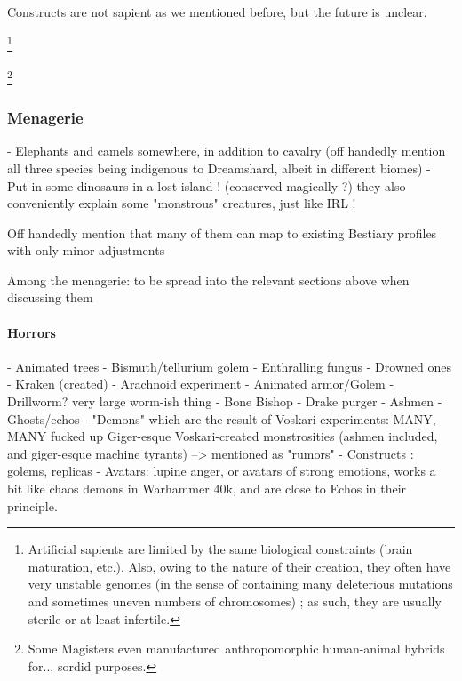 Constructs are not sapient as we mentioned before, but the future is unclear.


\footnote{Artificial sapients are limited by the same biological constraints (brain maturation, etc.). Also, owing to the nature of their creation, they often have very unstable genomes (in the sense of containing many deleterious mutations and sometimes uneven numbers of chromosomes) ; as such, they are usually sterile or at least infertile.}



\footnote{Some Magisters even manufactured anthropomorphic human-animal hybrids for... sordid purposes.}


















\subsubsection{Menagerie}

- Elephants and camels somewhere, in addition to cavalry (off handedly mention all three species being indigenous to Dreamshard, albeit in different biomes)
- Put in some dinosaurs in a lost island ! (conserved magically ?) they also conveniently explain some "monstrous" creatures, just like IRL !

Off handedly mention that many of them can map to existing Bestiary profiles with only minor adjustments


Among the menagerie: to be spread into the relevant sections above when discussing them


\paragraph{Horrors}

- Animated trees
- Bismuth/tellurium golem
- Enthralling fungus
- Drowned ones
- Kraken (created)
- Arachnoid experiment
- Animated armor/Golem
- Drillworm? very large worm-ish thing
- Bone Bishop
- Drake purger
- Ashmen
 - Ghosts/echos
- "Demons" which are the result of Voskari experiments:	MANY, MANY fucked up Giger-esque Voskari-created monstrosities (ashmen included, and giger-esque machine tyrants) –> mentioned as "rumors"
- Constructs : golems, replicas
- Avatars: lupine anger, or avatars of strong emotions, works a bit like chaos demons in Warhammer 40k, and are close to Echos in their principle.

